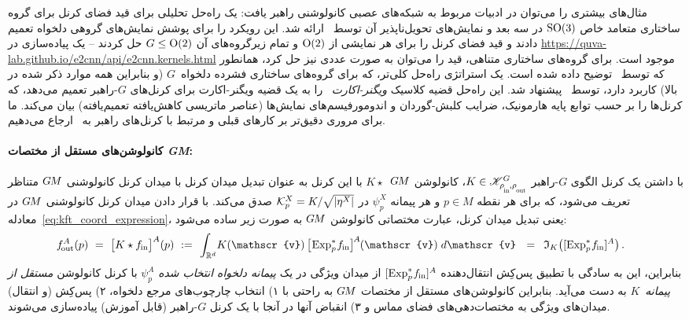 مثال‌های بیشتری را می‌توان در ادبیات مربوط به شبکه‌های عصبی کانولوشنی راهبر یافت:
یک راه‌حل تحلیلی برای قید فضای کرنل برای گروه ساختاری متعامد خاص $\operatorname{SO}(3)$ در سه بعد و نمایش‌های تحویل‌ناپذیر آن توسط~\citet{3d_steerableCNNs} ارائه شد.
\citet{Weiler2019_E2CNN} این رویکرد را برای پوشش نمایش‌های گروهی دلخواه تعمیم دادند و قید فضای کرنل را برای هر نمایشی از $\operatorname{O}(2)$ و تمام زیرگروه‌های آن $G\leq\operatorname{O}(2)$ حل کردند
-- یک پیاده‌سازی در \url{https://quva-lab.github.io/e2cnn/api/e2cnn.kernels.html} موجود است.
برای گروه‌های ساختاری متناهی، قید را می‌توان به صورت عددی نیز حل کرد، همانطور که توسط~\citet{Cohen2017-STEER} توضیح داده شده است.
یک استراتژی راه‌حل کلی‌تر، که برای گروه‌های ساختاری فشرده دلخواه~$G$ (و بنابراین همه موارد ذکر شده در بالا) کاربرد دارد، توسط~\citet{lang2020WignerEckart} پیشنهاد شد.
این راه‌حل قضیه کلاسیک \emph{ویگنر-اکارت}~\cite{agrawalla1980WignerEckart,jeevanjee2011reprOp,wigner1931gruppentheorie,wigner1993matrices} را به یک قضیه ویگنر-اکارت برای کرنل‌های $G$-راهبر تعمیم می‌دهد، که کرنل‌ها را بر حسب توابع پایه هارمونیک، ضرایب کلبش-گوردان و اندومورفیسم‌های نمایش‌ها (عناصر ماتریسی کاهش‌یافته تعمیم‌یافته) بیان می‌کند.
ما برای مروری دقیق‌تر بر کارهای قبلی و مرتبط با کرنل‌های راهبر به~\cite{lang2020WignerEckart} ارجاع می‌دهیم.












\paragraph{کانولوشن‌های مستقل از مختصات \textit{GM}:}

با داشتن یک کرنل الگوی $G$-راهبر $K\in\KG$، کانولوشن $G\mkern-1.4muM$~$K\star$ با این کرنل به عنوان تبدیل میدان کرنل با میدان کرنل کانولوشنی $G\mkern-1.4muM$ متناظر تعریف می‌شود، که برای هر نقطه $p\in M$ و هر پیمانه $\psi_p^X$ در $\mathcal{K}_p^X = K / \sqrt{|\eta^X|}$ صدق می‌کند.
با قرار دادن میدان کرنل کانولوشنی $G\mkern-1.4muM$ در معادله~\eqref{eq:kft_coord_expression}، یعنی تبدیل میدان کرنل، عبارت مختصاتی کانولوشن $G\mkern-1.4muM$ به صورت زیر ساده می‌شود:
\begin{align}\label{eq:gauge_conv_coord_expression}
	\fout^A(p)
	\ =\ 
	\big[ K \star \fin \big]^A(p)
	\ :=&\,\ 
	\int_{\R^d} \!
	K(\mathscr{v}) \,
	\big[\mkern-2mu \Expspfin\big]^{\mkern-2mu A} \mkern-1mu(\mathscr{v})
	\; d\mathscr{v}
	\ \ =\,\ \mathfrak{I}_K \big( [\Expspfin]^A \big)
	\,.
\end{align}
بنابراین، این به سادگی با تطبیق پس‌کِش انتقال‌دهنده $[\operatorname{Exp}^*_p\mkern-2mu f_\textup{\;\!\!in}]^A$ از میدان ویژگی در یک \emph{پیمانه دلخواه انتخاب شده} $\psi_p^A$ با کرنل کانولوشن \emph{مستقل از پیمانه}~$K$ به دست می‌آید.
بنابراین کانولوشن‌های مستقل از مختصات $G\mkern-1.4muM$ به راحتی با
۱) انتخاب چارچوب‌های مرجع دلخواه،
۲) پس‌کِش (و انتقال) میدان‌های ویژگی به مختصات‌دهی‌های فضای مماس و
۳) انقباض آنها در آنجا با یک کرنل $G$-راهبر (قابل آموزش) پیاده‌سازی می‌شوند.

